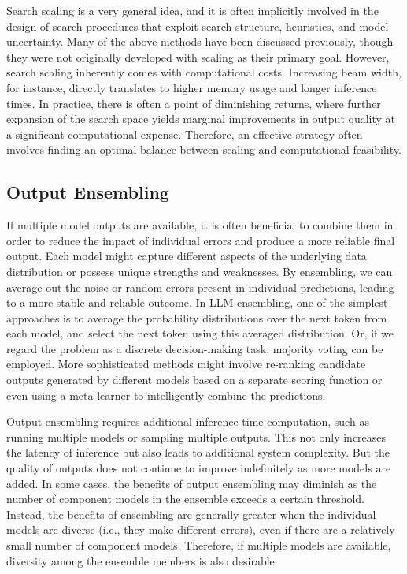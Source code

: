 Search scaling is a very general idea, and it is often implicitly involved in the design of search procedures that exploit search structure, heuristics, and model uncertainty. Many of the above methods have been discussed previously, though they were not originally developed with scaling as their primary goal. However, search scaling inherently comes with computational costs. Increasing beam width, for instance, directly translates to higher memory usage and longer inference times. In practice, there is often a point of diminishing returns, where further expansion of the search space yields marginal improvements in output quality at a significant computational expense. Therefore, an effective strategy often involves finding an optimal balance between scaling and computational feasibility.

\subsection{Output Ensembling}

If multiple model outputs are available, it is often beneficial to combine them in order to reduce the impact of individual errors and produce a more reliable final output. Each model might capture different aspects of the underlying data distribution or possess unique strengths and weaknesses. By ensembling, we can average out the noise or random errors present in individual predictions, leading to a more stable and reliable outcome. In LLM ensembling, one of the simplest approaches is to average the probability distributions over the next token from each model, and select the next token using this averaged distribution. Or, if we regard the problem as a discrete decision-making task, majority voting can be employed. More sophisticated methods might involve re-ranking candidate outputs generated by different models based on a separate scoring function or even using a meta-learner to intelligently combine the predictions.

Output ensembling requires additional inference-time computation, such as running multiple models or sampling multiple outputs. This not only increases the latency of inference but also leads to additional system complexity. But the quality of outputs does not continue to improve indefinitely as more models are added. In some cases, the benefits of output ensembling may diminish as the number of component models in the ensemble exceeds a certain threshold. Instead, the benefits of ensembling are generally greater when the individual models are diverse (i.e., they make different errors), even if there are a relatively small number of component models. Therefore, if multiple models are available, diversity among the ensemble members is also desirable.

